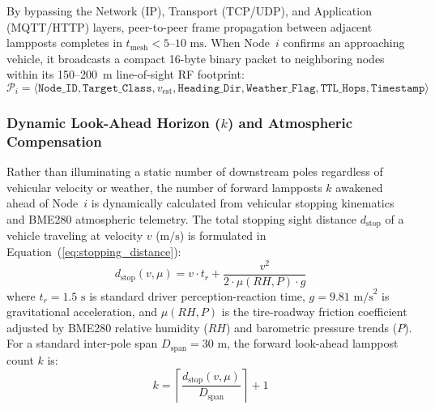 \documentclass[11pt,a4paper]{article}
\begin{document}
By bypassing the Network (IP), Transport (TCP/UDP), and Application (MQTT/HTTP) layers, peer-to-peer frame propagation between adjacent lampposts completes in \(t_{\text{mesh}} < 5\text{--}10\text{ ms}\). When Node~\(i\) confirms an approaching vehicle, it broadcasts a compact 16-byte binary packet to neighboring nodes within its 150--200~m line-of-sight RF footprint:
\begin{equation}
\mathcal{P}_{i} = \langle \texttt{Node\_ID}, \texttt{Target\_Class}, v_{\text{est}}, \texttt{Heading\_Dir}, \texttt{Weather\_Flag}, \texttt{TTL\_Hops}, \texttt{Timestamp} \rangle
\label{eq:espnow_packet}
\end{equation}

\subsubsection{Dynamic Look-Ahead Horizon (\(k\)) and Atmospheric Compensation}
Rather than illuminating a static number of downstream poles regardless of vehicular velocity or weather, the number of forward lampposts \(k\) awakened ahead of Node~\(i\) is dynamically calculated from vehicular stopping kinematics and BME280 atmospheric telemetry. The total stopping sight distance \(d_{\text{stop}}\) of a vehicle traveling at velocity \(v\) (\(\text{m/s}\)) is formulated in Equation~(\ref{eq:stopping_distance}):
\begin{equation}
d_{\text{stop}}(v, \mu) = v \cdot t_r + \frac{v^2}{2 \cdot \mu(RH, P) \cdot g}
\label{eq:stopping_distance}
\end{equation}
where \(t_r = 1.5\text{ s}\) is standard driver perception-reaction time, \(g = 9.81\text{ m/s}^2\) is gravitational acceleration, and \(\mu(RH, P)\) is the tire-roadway friction coefficient adjusted by BME280 relative humidity (\(RH\)) and barometric pressure trends (\(P\)). For a standard inter-pole span \(D_{\text{span}} = 30\text{ m}\), the forward look-ahead lamppost count \(k\) is:
\begin{equation}
k = \left\lceil \frac{d_{\text{stop}}(v, \mu)}{D_{\text{span}}} \right\rceil + 1
\label{eq:lookahead_k}
\end{equation}
\end{document}
